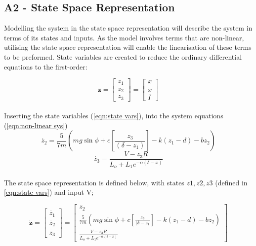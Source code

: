 \documentclass[a4paper,10pt,reqno]{amsart}
\numberwithin{equation}{section}
\begin{document}
\subsection{A2 - State Space Representation}\label{sec:A2}
\par Modelling the system in the state space representation will describe the system in terms of its states and inputs. As the model involves terms that are non-linear, utilising the state space representation will enable the linearisation of these terms to be preformed. State variables are created to reduce the ordinary differential equations to the first-order:

\begin{equation}
\label{eqn:state vars}
\bm{z}=
\begin{bmatrix}
z_1
\\
z_2
\\
z_3
\end{bmatrix}
=
\begin{bmatrix}
x
\\
\dot{x}
\\
I
\end{bmatrix}
\end{equation}
\\

Inserting the state variables (\ref{eqn:state vars}), into the system equations (\ref{eqn:non-linear sys}) 
\begin{equation}
    \dot{z_2}=\frac{5}{7m}(mg\sin{\phi}+c[\frac{z_3}{(\delta-z_1)}]-k(z_1-d)-bz_2)
    \label{eqn:non-linear z_2}
\end{equation}
\begin{equation}
    \dot{z_3}=\frac{V-z_3R}{L_o+L_1e^{-\alpha(\delta-x)}}
    \label{eqn:non-linear z_3}
\end{equation}
\\
The state space representation is defined below, with states $z1, z2, z3$ (defined in \ref{eqn:state vars}) and input V;

\begin{equation}\label{eqn:ssr}
\bm{\dot{z}}=
\begin{bmatrix}
\dot{z_1}
\\
\dot{z_2}
\\
\dot{z_3}
\end{bmatrix}
=
\begin{bmatrix}
z_2
\\
\frac{5}{7m}(mg\sin{\phi}+c[\frac{z_3}{(\delta-z_1}]-k(z_1-d)-bz_2)
\\
\frac{V-z_3R}{L_o+L_1e^{-\alpha(\delta-x)}}
\end{bmatrix}
\end{equation} 
\\
\newpage
\end{document}
